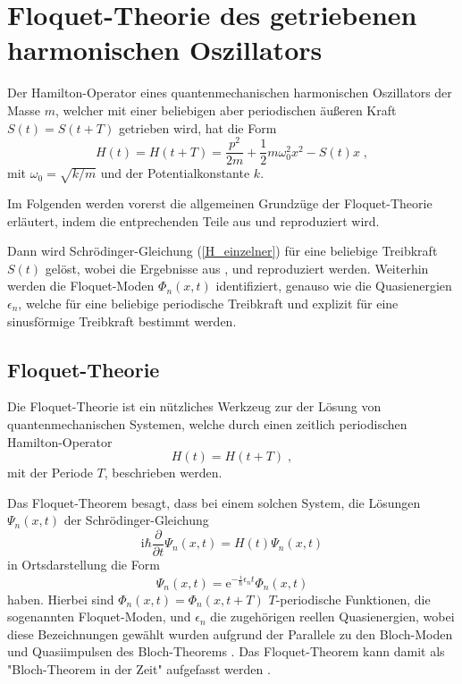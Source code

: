 \chapter{Floquet-Theorie des getriebenen harmonischen Oszillators}
Der Hamilton-Operator eines quantenmechanischen harmonischen Oszillators der Masse $m$, welcher mit einer beliebigen aber periodischen äußeren Kraft $S(t)=S(t+T)$ getrieben wird, hat die Form
\begin{equation}
  H(t) = H(t+T) = \frac{p^2}{2m} + \frac{1}{2}m\omega_0^2x^2-S(t)x \; ,
  \label{H_einzelner}
\end{equation}
mit $\omega_0=\sqrt{k/m}$ und der Potentialkonstante $k$.

Im Folgenden werden vorerst die allgemeinen Grundzüge der Floquet-Theorie erläutert, indem die entprechenden Teile aus \cite{haengi} und \cite{sherly} reproduziert wird.

Dann wird Schrödinger-Gleichung (\ref{H_einzelner}) für eine beliebige Treibkraft $S(t)$ gelöst, wobei die Ergebnisse aus \cite{haengi},\cite{husimi} und \cite{mads} reproduziert werden.
Weiterhin werden die Floquet-Moden $\Phi_n(x,t)$ identifiziert, genauso wie die Quasienergien $\epsilon_n$, welche für eine beliebige periodische Treibkraft und explizit für eine sinusförmige Treibkraft bestimmt werden.
\iffalse
Danach werden wir die Ewartungswerte $\braket{x}_n,\braket{x^2}_n,\braket{p}_n,\braket{p^2}_n$ und damit die Unschärfe berechnen, indem wir die bekannten Erwartungswerte des ungetriebenen Oszillators benutzen.
Ebenso werden wir den zeitabhängigen und gemittelten Erwartungswert der Energie $\braket{H}_n$ und $\bar H_n$ berechnen.
\fi

\section{Floquet-Theorie}
  Die Floquet-Theorie \cite{haengi} ist ein nützliches Werkzeug zur der Lösung von quantenmechanischen Systemen, welche durch einen zeitlich periodischen Hamilton-Operator
  \begin{equation}
    H(t) = H(t+T) \; ,
  \end{equation}
  mit der Periode $T$, beschrieben werden.

  Das Floquet-Theorem besagt, dass bei einem solchen System, die Lösungen $\Psi_n(x,t)$ der Schrödinger-Gleichung
  \begin{equation}
    \text{i}\hbar\frac{\partial}{\partial t}\Psi_n(x,t) = H(t)\Psi_n(x,t)
    \label{schroedinger}
  \end{equation}
  in Ortsdarstellung die Form
  \begin{equation}
    \Psi_n(x,t) = \text{e}^{-\frac{i}{\hbar}\epsilon_nt}\Phi_n(x,t)
    \label{floquet_theorem}
  \end{equation}
  haben.
  Hierbei sind $\Phi_n(x,t) = \Phi_n(x,t+T)$ $T$-periodische Funktionen, die sogenannten Floquet-Moden, und $\epsilon_n$ die zugehörigen reellen Quasienergien, wobei diese Bezeichnungen gewählt wurden aufgrund der Parallele zu den Bloch-Moden und Quasiimpulsen des Bloch-Theorems \cite{haengi}.
  Das Floquet-Theorem kann damit als "Bloch-Theorem in der Zeit" aufgefasst werden \cite{sherly}.

